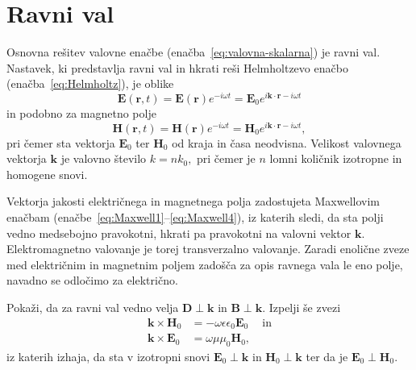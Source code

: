 \section{Ravni val}
Osnovna rešitev valovne enačbe (enačba~\ref{eq:valovna-skalarna}) je ravni 
val. Nastavek, ki predstavlja
ravni val in hkrati reši Helmholtzevo enačbo (enačba~\ref{eq:Helmholtz}), je oblike
\begin{equation}
\mathbf{E}(\mathbf{r},t)  =\mathbf{E}(\mathbf{r})e^{-i\omega t}=
\mathbf{E}_{0}e^{i\mathbf{k}\cdot\mathbf{r}-i \omega t}
\end{equation}
in podobno za magnetno polje
\begin{equation}
 \mathbf{H}(\mathbf{r},t)  =\mathbf{H}(\mathbf{r})e^{-i\omega t}=
\mathbf{H}_{0}e^{i\mathbf{k}\cdot\mathbf{r}-i \omega t},
\end{equation}
pri čemer sta vektorja $\mathbf{E}_{0}$ ter $\mathbf{H}_{0}$ od kraja in časa neodvisna. 
Velikost valovnega vektorja $\mathbf{k}$ je valovno število $k=nk_{0},$ pri
čemer je $n$ lomni količnik izotropne in homogene snovi. 

Vektorja jakosti električnega in magnetnega polja zadostujeta
Maxwellovim enačbam (enačbe~\ref{eq:Maxwell1}--\ref{eq:Maxwell4}), iz katerih sledi,
da sta polji vedno medsebojno pravokotni, 
hkrati pa pravokotni na valovni vektor $\mathbf{k}$. Elektromagnetno valovanje je torej
transverzalno valovanje. 
Zaradi enolične zveze med električnim in magnetnim poljem zadošča
za opis ravnega vala le eno polje, navadno se odločimo za električno.

\begin{definition}
\label{naloga-TEM-ortogonalnost}
Pokaži, da za ravni val vedno velja $\mathbf{D} \perp \mathbf{k}$ in 
$\mathbf{B} \perp \mathbf{k}$. Izpelji še zvezi
\begin{align}
\mathbf{k}\times\mathbf{H}_{0} & =-\omega\epsilon\epsilon_{0}\mathbf{E}_{0}\label{eq:TEM-pogoj1}\
\quad \mathrm{in}\\
\mathbf{k}\times\mathbf{E}_{0} & =\omega\mu\mu_{0}\mathbf{H}_{0}\label{eq:TEM-pogoj2},
\end{align}
iz katerih izhaja, da sta v izotropni snovi $\mathbf{E}_0\perp \mathbf{k}$ in 
$\mathbf{H}_0\perp \mathbf{k}$ ter da je $\mathbf{E}_0\perp \mathbf{H}_0$.
\end{definition}

